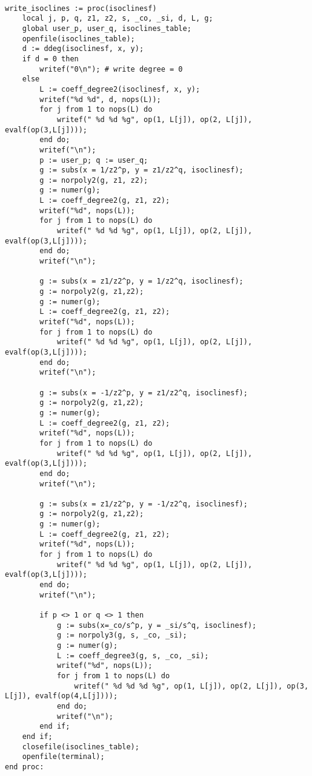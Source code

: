 \documentclass[a4paper,10pt]{article}
\begin{document}
\begin{lstlisting}[name=writelog3]

write_isoclines := proc(isoclinesf)
    local j, p, q, z1, z2, s, _co, _si, d, L, g;
    global user_p, user_q, isoclines_table;
    openfile(isoclines_table);
    d := ddeg(isoclinesf, x, y);
    if d = 0 then
        writef("0\n"); # write degree = 0
    else
        L := coeff_degree2(isoclinesf, x, y);
        writef("%d %d", d, nops(L));
        for j from 1 to nops(L) do
            writef(" %d %d %g", op(1, L[j]), op(2, L[j]), evalf(op(3,L[j])));
        end do;
        writef("\n");
        p := user_p; q := user_q;
        g := subs(x = 1/z2^p, y = z1/z2^q, isoclinesf);
        g := norpoly2(g, z1, z2);
        g := numer(g);
        L := coeff_degree2(g, z1, z2);
        writef("%d", nops(L));
        for j from 1 to nops(L) do
            writef(" %d %d %g", op(1, L[j]), op(2, L[j]), evalf(op(3,L[j])));
        end do;
        writef("\n");

        g := subs(x = z1/z2^p, y = 1/z2^q, isoclinesf);
        g := norpoly2(g, z1,z2);
        g := numer(g);
        L := coeff_degree2(g, z1, z2);
        writef("%d", nops(L));
        for j from 1 to nops(L) do
            writef(" %d %d %g", op(1, L[j]), op(2, L[j]), evalf(op(3,L[j])));
        end do;
        writef("\n");

        g := subs(x = -1/z2^p, y = z1/z2^q, isoclinesf);
        g := norpoly2(g, z1,z2);
        g := numer(g);
        L := coeff_degree2(g, z1, z2);
        writef("%d", nops(L));
        for j from 1 to nops(L) do
            writef(" %d %d %g", op(1, L[j]), op(2, L[j]), evalf(op(3,L[j])));
        end do;
        writef("\n");

        g := subs(x = z1/z2^p, y = -1/z2^q, isoclinesf);
        g := norpoly2(g, z1,z2);
        g := numer(g);
        L := coeff_degree2(g, z1, z2);
        writef("%d", nops(L));
        for j from 1 to nops(L) do
            writef(" %d %d %g", op(1, L[j]), op(2, L[j]), evalf(op(3,L[j])));
        end do;
        writef("\n");

        if p <> 1 or q <> 1 then
            g := subs(x=_co/s^p, y = _si/s^q, isoclinesf);
            g := norpoly3(g, s, _co, _si);
            g := numer(g);
            L := coeff_degree3(g, s, _co, _si);
            writef("%d", nops(L));
            for j from 1 to nops(L) do
                writef(" %d %d %d %g", op(1, L[j]), op(2, L[j]), op(3, L[j]), evalf(op(4,L[j])));
            end do;
            writef("\n");
        end if;
    end if;
    closefile(isoclines_table);
    openfile(terminal);
end proc:
\end{lstlisting}
\end{document}
